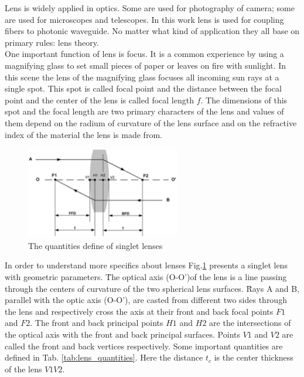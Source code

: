Lens is widely applied in optics. Some are used for photography of camera; some are used for microscopes and telescopes.  In this work lens is used for coupling fibers to photonic waveguide. No matter what kind of application they all base on primary rules: lens theory.\\
One important function of lens is focus. It is a common experience by using a magnifying glass to set small pieces of paper or leaves on fire with sunlight. In this scene the lens of the magnifying glass focuses all incoming sun rays at a single spot. This spot is called focal point and the distance between the focal point and the center of the lens is called focal length $f$. The dimensions of this spot and the focal length are two primary characters of the lens and values of them depend on the radium of curvature of the lens surface and on the refractive index of the material the lens is made from. \\
\begin{figure}[httbp]
\centering
\includegraphics[width=0.6\textwidth]{bilder/lens_define}
\caption{The quantities define of singlet lenses \cite{lens_theory_LC_Ltd}}
\label{fig:lens_define}
\end{figure}

In order to understand more specifics about lenses Fig.\ref{fig:lens_define}  presents a singlet lens with geometric parameters. \"The optical axis (O-O')of the lens is a line passing through the centers of curvature of the two spherical lens surfaces. \"
Rays A and B, parallel with the optic axis (O-O'), are casted from different two sides through the lens and respectively cross the axis at their front and back focal points $F1$ and $F2$. The front and back principal points $H1$ and $H2$ are the intersections of the optical axis with the front and back principal surfaces. Points $V1$ and $V2$ are called the front and back vertices respectively\cite{lens_theory_LC_Ltd}.  Some important quantities are defined in Tab. \ref{tab:lens_quantities}. Here the distance $t_{c}$ is the center thickness of the lens $V1V2$.\\

